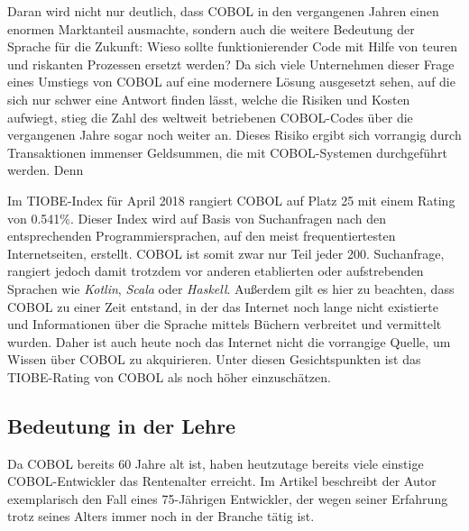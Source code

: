 Daran wird nicht nur deutlich, dass COBOL in den vergangenen Jahren einen enormen Marktanteil ausmachte, sondern auch die weitere Bedeutung der Sprache für die Zukunft: Wieso sollte funktionierender Code mit Hilfe von teuren und riskanten Prozessen ersetzt werden? Da sich viele Unternehmen dieser Frage eines Umstiegs von COBOL auf eine modernere Lösung ausgesetzt sehen, auf die sich nur schwer eine Antwort finden lässt, welche die Risiken und Kosten aufwiegt, stieg die Zahl des weltweit betriebenen COBOL-Codes über die vergangenen Jahre sogar noch weiter an. Dieses Risiko ergibt sich vorrangig durch Transaktionen immenser Geldsummen, die mit COBOL-Systemen durchgeführt werden. Denn  \cite{beat_balzli_cobol-programmierer_2017}

Im TIOBE-Index \cite{_tiobe_} für April 2018 rangiert COBOL auf Platz 25 mit einem Rating von 0.541\%. Dieser Index wird auf Basis von Suchanfragen nach den entsprechenden Programmiersprachen, auf den meist frequentiertesten Internetseiten, erstellt. COBOL ist somit zwar nur Teil jeder 200. Suchanfrage, rangiert jedoch damit trotzdem vor anderen etablierten oder aufstrebenden Sprachen wie \textit{Kotlin}, \textit{Scala} oder \textit{Haskell}. Außerdem gilt es hier zu beachten, dass COBOL zu einer Zeit entstand, in der das Internet noch lange nicht existierte und Informationen über die Sprache mittels Büchern verbreitet und vermittelt wurden. Daher ist auch heute noch das Internet nicht die vorrangige Quelle, um Wissen über COBOL zu akquirieren. Unter diesen Gesichtspunkten ist das TIOBE-Rating von COBOL als noch höher einzuschätzen.


\subsection*{Bedeutung in der Lehre}
Da COBOL bereits 60 Jahre alt ist, haben heutzutage bereits viele einstige COBOL-Entwickler das Rentenalter erreicht. Im Artikel  beschreibt der Autor exemplarisch den Fall eines 75-Jährigen Entwickler, der wegen seiner Erfahrung trotz seines Alters immer noch in der Branche tätig ist.

